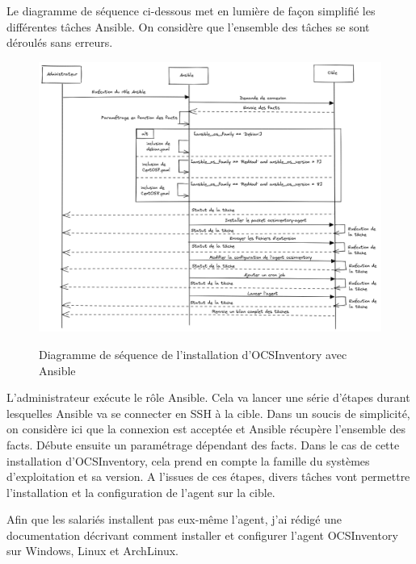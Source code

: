 \documentclass[12pt]{article}
\begin{document}
\newpage
Le diagramme de séquence ci-dessous met en lumière de façon simplifié les différentes tâches \gls{Ansible}. On considère que l'ensemble des tâches se sont déroulés sans erreurs.

\begin{figure}[!ht]
    \centering
    \includegraphics[width=\textwidth]{src/graph_ansible_ocs.png}
    \label{fig:ansible_ocs}
    \caption{Diagramme de séquence de l'installation d'\gls{OCSInventory} avec \gls{Ansible}}
\end{figure}

L'administrateur exécute le rôle \gls{Ansible}.
Cela va lancer une série d'étapes durant lesquelles \gls{Ansible} va se connecter en SSH à la cible.
Dans un soucis de simplicité, on considère ici que la connexion est acceptée et \gls{Ansible} récupère l'ensemble des facts.
Débute ensuite un paramétrage dépendant des facts. 
Dans le cas de cette installation d'\gls{OCSInventory}, cela prend en compte la famille du systèmes d'exploitation et sa version.
A l'issues de ces étapes, divers tâches vont permettre l'installation et la configuration de l'agent sur la cible.

Afin que les salariés installent pas eux-même l'agent, j'ai rédigé une documentation décrivant comment installer et configurer l'agent \gls{OCSInventory} sur Windows, \gls{Linux} et ArchLinux.
\end{document}
